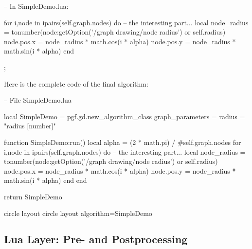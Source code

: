 \begin{codeexample}
-- In SimpleDemo.lua:

  for i,node in ipairs(self.graph.nodes) do
    -- the interesting part...
    local node_radius = tonumber(node:getOption('/graph drawing/node radius')
                                 or self.radius)
    node.pos.x = node_radius * math.cos(i * alpha)
    node.pos.y = node_radius * math.sin(i * alpha)
  end
   
\end{codeexample}

\begin{codeexample}[]
\tikz {};
\end{codeexample}

Here is the complete code of the final algorithm:
\begin{codeexample}
-- File SimpleDemo.lua

local SimpleDemo = pgf.gd.new_algorithm_class {
  graph_parameters = { radius = "radius [number]" }
}

function SimpleDemo:run()
  local alpha = (2 * math.pi) / #self.graph.nodes
  for i,node in ipairs(self.graph.nodes) do
    -- the interesting part...
    local node_radius = tonumber(node:getOption('/graph drawing/node radius')
                                 or self.radius)
    node.pos.x = node_radius * math.cos(i * alpha)
    node.pos.y = node_radius * math.sin(i * alpha)
  end
end
   
return SimpleDemo  
\end{codeexample}

\begin{codeexample}
  
\pgfgddeclarealgorithmkey
  {circle layout}
  {circle layout}
  {algorithm=SimpleDemo}

\end{codeexample}




\subsection{Lua Layer: Pre- and Postprocessing}

